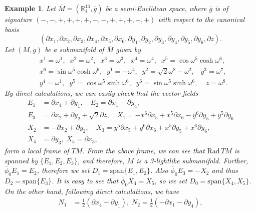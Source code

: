 \documentclass[reqno, 12pt]{amsart}
\numberwithin{equation}{section}
\newtheorem{example}[theorem]{Example}
\begin{document}
\begin{example}\label{exa1}
{\rm
Let $\overline{M}=(\mathbb{R}_4^{13}, \overline{g})$ be a semi-Euclidean space,  where $\overline{g}$ is of signature $(-,-,+,+,+,+, - , -,+,+,+,+,+)$ with respect to the canonical basis
\begin{equation*}
 (\partial x_{1},\partial x_{2},\partial x_{3},\partial x_{4},\partial x_{5},\partial x_{6}, \partial y_{1},\partial y_{2},\partial y_{3},\partial y_{4},\partial y_{5},\partial y_{6},\partial z).
\end{equation*}
Let $(M,g)$ be a submanifold of $\overline{M}$ given by 
\begin{align*}
 &x^{1}=\omega^{1},\;\;x^{2}=\omega^{2},\;\;x^{3}=\omega^{3},\;\;x^{4}=\omega^{4},\;\;x^{5}=\cos\omega^{5}\cosh\omega^{6},\\&x^{6}=\sin\omega^{5}\cosh\omega^{6}, \;\; y^{1}=-\omega^{4},\;\;y^{2}=\sqrt{2}\omega^{8}-\omega^{2},\;\;\;y^{3}=\omega^{7},\\& y^{4}=\omega^{1},\;\;  y^{5}=\cos\omega^{5}\sinh\omega^{6},\;\;y^{6}=\sin\omega^{5}\sinh\omega^{6},\;\;\;\;z=\omega^{8}.
 \end{align*}
By direct calculations, we can easily check that the vector fields
\begin{align*} 
 E_1 & =\partial x_4+\partial y_1,\quad E_2=\partial x_1-\partial y_4,\\
 E_3 & = \partial x_2 +\partial y_2+\sqrt{2}\partial z, \quad X_{1}=-x^{6}\partial x_{5}+x^{5}\partial x_{6}  -y^{6}\partial y_{5}+y^{5}\partial y_{6}\\ 
 X_{2} & =-\partial x_{2} +\partial y_{2},\quad  X_{3}=y^{5}\partial x_{5}+y^{6}\partial x_{6}+x^{5}\partial y_{5}+x^{6}\partial y_{6},\\
 X_{4}&=\partial y_{3},\; X_{5}=\partial x_{3}, 
\end{align*}
form a local frame of $TM$. From the above frame, we can see that $\mathrm{Rad} \, TM$ is spanned by $\{E_{1}, E_{2}, E_{3}\}$, and therefore, $M$ is a 3-lightlike submanifold. Further, $\overline{\phi}_0 E_1=E_2$, therefore we set $D_{1}=\mbox{span}\{E_{1},E_{2}\}$. Also $\overline{\phi}_0 E_3=-X_2$ and thus $D_2=\mathrm{span}\{E_3\}$. It is easy to see that $\overline{\phi}_{0} X_{4}=X_{5}$, so we set $D_{0}=\mathrm{span}\{X_{4},X_{5}\}$. On the other hand, following direct calculations, we have 
\begin{align} 
 N_{1} & =\frac{1}{2}(\partial x_{4}-\partial y_1),\;  N_{2}=\frac{1}{2}(-\partial x_{1}-\partial y_{4}),\nonumber\\

\end{align}}
\end{example}
\end{document}
